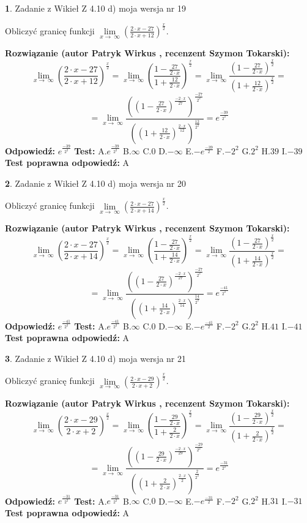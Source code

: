 \documentclass[12pt, a4paper]{article}
\theoremstyle{definition} %
\newtheorem{zad}{}
\newcommand{\zadStart}[1]{\begin{zad}#1\newline}
\newcommand{\zadStop}{\end{zad}}
\newcommand{\rozwStart}[2]{\noindent \textbf{Rozwiązanie (autor #1 , recenzent #2): }\newline}
\newcommand{\rozwStop}{\newline}
\newcommand{\odpStart}{\noindent \textbf{Odpowiedź:}\newline}
\newcommand{\odpStop}{\newline}
\newcommand{\testStart}{\noindent \textbf{Test:}\newline}
\newcommand{\testStop}{\newline}
\newcommand{\kluczStart}{\noindent \textbf{Test poprawna odpowiedź:}\newline}
\newcommand{\kluczStop}{\newline}
\begin{document}
\zadStart{Zadanie z Wikieł Z 4.10 d) moja wersja nr 19}


Obliczyć granicę funkcji  $\lim\limits_{x\to\ \infty}(\frac{2\cdot x-27}{2\cdot x+12})^{\frac{x}{2}}$.
\zadStop
\rozwStart{Patryk Wirkus}{Szymon Tokarski}
$$\lim\limits_{x\to\ \infty}(\frac{2\cdot x-27}{2\cdot x+12})^{\frac{x}{2}} = \lim\limits_{x\to\ \infty}(\frac{1-\frac{27}{2\cdot x}}{1+\frac{12}{2\cdot x}})^{\frac{x}{2}}=\lim\limits_{x\to\ \infty}\frac{(1-\frac{27}{2\cdot x})^{\frac{x}{2}}}{(1+\frac{12}{2\cdot x})^{\frac{x}{2}}}=$$
$$=\lim\limits_{x\to\ \infty}\frac{((1-\frac{27}{2\cdot x})^{\frac{-2\cdot x}{27}})^{\frac{-27}{2^{2}}}}{((1+\frac{12}{2\cdot x})^{\frac{2\cdot x}{12}})^{\frac{12}{2^{2}}}}=e^{\frac{-39}{2^{2}}}$$
\rozwStop
\odpStart
$e^{\frac{-39}{2^{2}}}$
\odpStop
\testStart
A.$e^{\frac{-39}{2^{2}}}$ B.$\infty$ C.$0$ D.$-\infty$ E.$-e^{\frac{-39}{2}}$
F.$-2^{2}$ G.$2^{2}$
H.$39$
I.$-39$
\testStop
\kluczStart
A
\kluczStop



\zadStart{Zadanie z Wikieł Z 4.10 d) moja wersja nr 20}


Obliczyć granicę funkcji  $\lim\limits_{x\to\ \infty}(\frac{2\cdot x-27}{2\cdot x+14})^{\frac{x}{2}}$.
\zadStop
\rozwStart{Patryk Wirkus}{Szymon Tokarski}
$$\lim\limits_{x\to\ \infty}(\frac{2\cdot x-27}{2\cdot x+14})^{\frac{x}{2}} = \lim\limits_{x\to\ \infty}(\frac{1-\frac{27}{2\cdot x}}{1+\frac{14}{2\cdot x}})^{\frac{x}{2}}=\lim\limits_{x\to\ \infty}\frac{(1-\frac{27}{2\cdot x})^{\frac{x}{2}}}{(1+\frac{14}{2\cdot x})^{\frac{x}{2}}}=$$
$$=\lim\limits_{x\to\ \infty}\frac{((1-\frac{27}{2\cdot x})^{\frac{-2\cdot x}{27}})^{\frac{-27}{2^{2}}}}{((1+\frac{14}{2\cdot x})^{\frac{2\cdot x}{14}})^{\frac{14}{2^{2}}}}=e^{\frac{-41}{2^{2}}}$$
\rozwStop
\odpStart
$e^{\frac{-41}{2^{2}}}$
\odpStop
\testStart
A.$e^{\frac{-41}{2^{2}}}$ B.$\infty$ C.$0$ D.$-\infty$ E.$-e^{\frac{-41}{2}}$
F.$-2^{2}$ G.$2^{2}$
H.$41$
I.$-41$
\testStop
\kluczStart
A
\kluczStop



\zadStart{Zadanie z Wikieł Z 4.10 d) moja wersja nr 21}


Obliczyć granicę funkcji  $\lim\limits_{x\to\ \infty}(\frac{2\cdot x-29}{2\cdot x+2})^{\frac{x}{2}}$.
\zadStop
\rozwStart{Patryk Wirkus}{Szymon Tokarski}
$$\lim\limits_{x\to\ \infty}(\frac{2\cdot x-29}{2\cdot x+2})^{\frac{x}{2}} = \lim\limits_{x\to\ \infty}(\frac{1-\frac{29}{2\cdot x}}{1+\frac{2}{2\cdot x}})^{\frac{x}{2}}=\lim\limits_{x\to\ \infty}\frac{(1-\frac{29}{2\cdot x})^{\frac{x}{2}}}{(1+\frac{2}{2\cdot x})^{\frac{x}{2}}}=$$
$$=\lim\limits_{x\to\ \infty}\frac{((1-\frac{29}{2\cdot x})^{\frac{-2\cdot x}{29}})^{\frac{-29}{2^{2}}}}{((1+\frac{2}{2\cdot x})^{\frac{2\cdot x}{2}})^{\frac{2}{2^{2}}}}=e^{\frac{-31}{2^{2}}}$$
\rozwStop
\odpStart
$e^{\frac{-31}{2^{2}}}$
\odpStop
\testStart
A.$e^{\frac{-31}{2^{2}}}$ B.$\infty$ C.$0$ D.$-\infty$ E.$-e^{\frac{-31}{2}}$
F.$-2^{2}$ G.$2^{2}$
H.$31$
I.$-31$
\testStop
\kluczStart
A
\kluczStop
\end{document}
